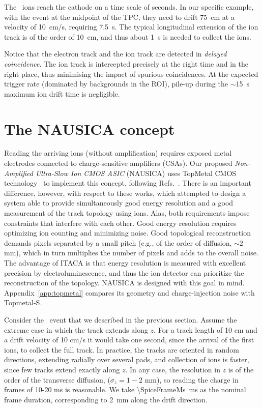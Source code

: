 \documentclass[11pt,a4paper]{article}
\begin{document}
     
The \xetp\ ions reach the cathode on a time scale of seconds. In our specific example, with the event at the midpoint of the TPC, they need to drift \SI{75}{cm} at a velocity of \SI{10}{cm/s}, requiring \SI{7.5}{s}. 
The typical longitudinal extension of the ion track is of the order of \SI{10}{cm}, and thus about \SI{1}{s} is needed to collect the ions. 

Notice that the electron track and the ion track are detected in \emph{delayed coincidence}. The ion track is intercepted precisely at the right time and in the right place, thus minimising the impact of spurious coincidences. At the expected trigger rate (dominated by backgrounds in the ROI), pile-up during the $\sim$\SI{15}{s} maximum ion drift time is negligible.


\section{The NAUSICA concept}
\label{sec:nausica}

Reading the arriving ions (without amplification) requires exposed metal electrodes connected to charge-sensitive amplifiers (CSAs). Our proposed  \emph{Non-Amplified Ultra-Slow Ion CMOS ASIC} (NAUSICA) uses TopMetal CMOS technology~\cite{An2016TopmetalII} to implement this concept, following Refs.~\cite{Nygren_2018, mei2020topmetalcmosdirectcharge}. There is an important difference, however, with respect to these works, which attempted to design a system able to provide simultaneously good energy resolution and a good measurement of the track topology using ions. Alas, both requirements impose constraints that interfere with each other. Good energy resolution requires optimizing ion counting and minimizing noise. Good topological reconstruction demands pixels separated by a small pitch (e.g., of the order of diffusion, $\sim 2$ mm), which in turn multiplies the number of pixels and adds to the overall noise. The advantage of ITACA is that energy resolution is measured with excellent precision by electroluminescence, and thus the ion detector can prioritize the reconstruction of the topology. NAUSICA is designed with this goal in mind. Appendix~\ref{app:topmetal} compares its geometry and charge-injection noise with Topmetal-S.

Consider the \bbonu\ event that we described in the previous section. Assume the extreme case in which the track extends along $z$. For a track length of 10 cm and a drift velocity of 10 cm/s it would take one second, since the arrival of the first ions, to collect the full track. In practice, the tracks are oriented in random directions, extending radially over several pads, and collection of ions is faster, since few tracks extend exactly along $z$. In any case,  the resolution in $z$ is of the order of the transverse diffusion, ($\sigma_z = 1-2$ mm), so reading the charge in frames of 10-20 ms is reasonable. We take \SI{\SpiceFrameMs}{ms} as the nominal frame duration, corresponding to \SI{2}{mm} along the drift direction.
\end{document}
